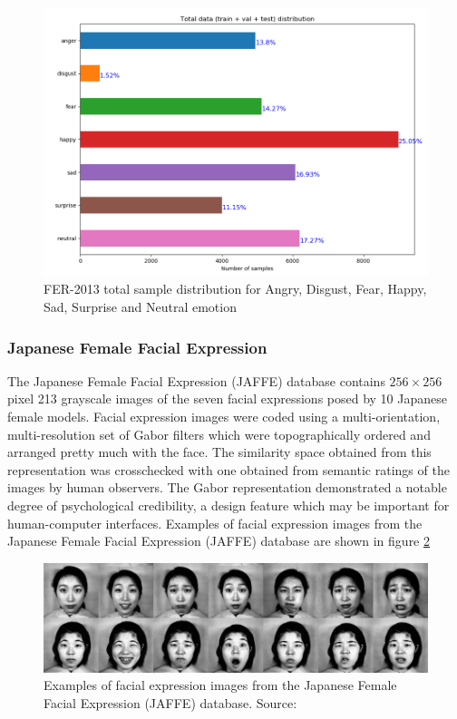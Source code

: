 \documentclass[master]{thesis-uestc}
\begin{document}
\begin{figure}[ht]
\includegraphics[width=5in]{pic/total_data_distribution.png}
\caption{FER-2013 total sample distribution for Angry, Disgust, Fear, Happy, Sad, Surprise and Neutral emotion}
\label{fer2013_distribution}
\end{figure}

\subsubsection{Japanese Female Facial Expression}
The Japanese Female Facial Expression (JAFFE) database\cite{Michael-2017} contains $256\times256$ pixel 213 grayscale images of the seven facial expressions posed by 10 Japanese female models. Facial expression images were coded using a multi-orientation, multi-resolution set of Gabor filters which were topographically ordered and arranged pretty much with the face. The similarity space
obtained from this representation was crosschecked with one obtained from semantic ratings of the images by human observers. The Gabor representation demonstrated a notable degree of psychological credibility, a design feature which may be important for human-computer interfaces. Examples of facial expression images from the Japanese Female Facial Expression (JAFFE) database are shown in figure \ref{jaffe_images} 
\begin{figure}[ht]
\includegraphics[width=5in]{pic/jaffe.png}
\caption{Examples of facial expression images from the Japanese Female Facial Expression (JAFFE) database. Source: \cite{Michael-2017}}
\label{jaffe_images}
\end{figure}
\end{document}
